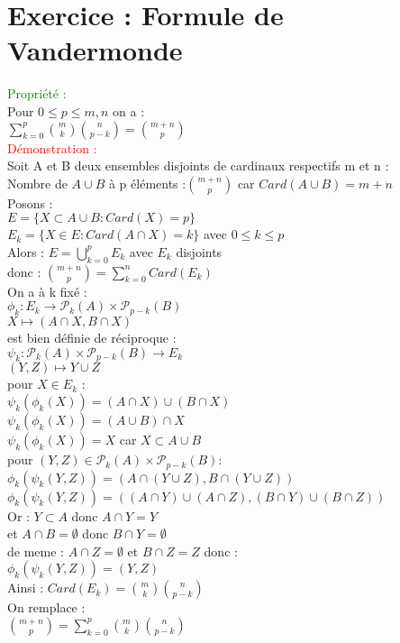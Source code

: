 \documentclass{article}
\begin{document}
\section{ Exercice : Formule de Vandermonde}
\textcolor{green}{Propriété :} \\
Pour $0 \leq p \leq m,n$ on a : \\
$\sum_{k=0}^p \binom{m}{k} \binom{n}{p-k}= \binom{m+n}{p}$ \\
\textcolor{red}{Démonstration :} \\
Soit A et B deux ensembles disjoints de cardinaux respectifs m et n : \\
Nombre de $A\cup B$ à p éléments :$\binom{m+n}{p}$ car $Card(A \cup B)=m+n$ \\
Posons : \\
$E=\lbrace X \subset A\cup B : Card(X)=p \rbrace $ \\
$E_k= \lbrace X \in E : Card(A \cap X)=k  \rbrace $ avec $0 \leq k \leq p$ \\
Alors : $E= \bigcup_{k=0}^p E_k$ avec $E_k$ disjoints \\
donc : $\binom{m+n}{p}= \sum_{k=0}^n Card(E_k)$ \\
On a à k fixé : \\
$\phi_k : E_k \rightarrow  \mathcal P_k(A) \times \mathcal P_{p-k}(B)$ \\
$X \mapsto (A \cap X, B \cap X)$ \\
est bien définie de réciproque : \\
$\psi_k: \mathcal P_k(A) \times \mathcal P_{p-k} (B) \rightarrow E_k$ \\
$(Y,Z) \mapsto Y \cup Z$ \\
pour $X \in E_k$ : \\
$\psi_k(\phi_k(X))=(A\cap X) \cup (B \cap X)$ \\
$\psi_k(\phi_k(X))=(A\cup B)\cap X$ \\
$\psi_k(\phi_k(X))=X$ car $X \subset A\cup B$ \\
pour $(Y,Z) \in \mathcal P_k(A) \times \mathcal P_{p-k}(B) :$ \\
$\phi_k(\psi_k(Y,Z))=(A\cap(Y\cup Z), B \cap(Y \cup Z))$ \\
$\phi_k(\psi_k(Y,Z))=((A\cap Y)\cup(A \cap Z),(B\cap Y) \cup (B \cap Z))$ \\
Or : $Y \subset A$ donc $A\cap Y= Y$ \\
et $A\cap B= \emptyset$ donc $B \cap Y=\emptyset$ \\
de meme : $A \cap Z = \emptyset$ et $B \cap Z=Z$ donc : \\
$\phi_k(\psi_k(Y,Z))=(Y,Z)$ \\
Ainsi : $Card(E_k)=\binom{m}{k} \binom{n}{p-k} $ \\
On remplace : \\
$\binom{m+n}{p}= \sum_{k=0}^p \binom{m}{k} \binom{n}{p-k}$ \\
\end{document}
